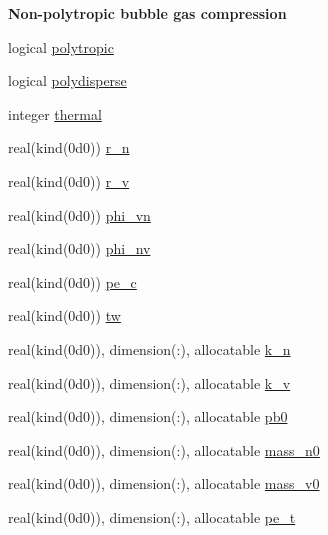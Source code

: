 \begin{Indent}\textbf{ Non-\/polytropic bubble gas compression}\par
\begin{DoxyCompactItemize}
\item 
logical \hyperlink{namespacem__global__parameters_a8d670f2f984167bae71b7b3f12d0908a}{polytropic}
\item 
logical \hyperlink{namespacem__global__parameters_a32791d9d5fef0213f01fc31713b17ae8}{polydisperse}
\item 
integer \hyperlink{namespacem__global__parameters_a17169a5387f8f1efd5ac34cb4eae7c81}{thermal}
\item 
real(kind(0d0)) \hyperlink{namespacem__global__parameters_ae818e88601b1dc579a87e7c0c8cd87cb}{r\+\_\+n}
\item 
real(kind(0d0)) \hyperlink{namespacem__global__parameters_af2ee1ad578115833bb6b8e9550eb5f18}{r\+\_\+v}
\item 
real(kind(0d0)) \hyperlink{namespacem__global__parameters_acc6771df62005731bbec282b0c9a5659}{phi\+\_\+vn}
\item 
real(kind(0d0)) \hyperlink{namespacem__global__parameters_a7dbd1ec1fd1ece4e997a825fa07785eb}{phi\+\_\+nv}
\item 
real(kind(0d0)) \hyperlink{namespacem__global__parameters_ac1375e5145e018847d9025e83e58b49d}{pe\+\_\+c}
\item 
real(kind(0d0)) \hyperlink{namespacem__global__parameters_aa77b0836fe22478b69e10e656ef7fcc2}{tw}
\item 
real(kind(0d0)), dimension(\+:), allocatable \hyperlink{namespacem__global__parameters_a555eda1318a218d37d1bdd8f4d57eaf2}{k\+\_\+n}
\item 
real(kind(0d0)), dimension(\+:), allocatable \hyperlink{namespacem__global__parameters_a1943ea5a5127e94a197afae57be95758}{k\+\_\+v}
\item 
real(kind(0d0)), dimension(\+:), allocatable \hyperlink{namespacem__global__parameters_a1097b95561b65a9035e5f9218de577f9}{pb0}
\item 
real(kind(0d0)), dimension(\+:), allocatable \hyperlink{namespacem__global__parameters_ae3701f74c9487c9e56c2a11fb6a52e40}{mass\+\_\+n0}
\item 
real(kind(0d0)), dimension(\+:), allocatable \hyperlink{namespacem__global__parameters_a6a06981be6cdab78452a106009022aa4}{mass\+\_\+v0}
\item 
real(kind(0d0)), dimension(\+:), allocatable \hyperlink{namespacem__global__parameters_a8a75928178eef1550c6a0389ff12b44a}{pe\+\_\+t}

\end{DoxyCompactItemize}
\end{Indent}
